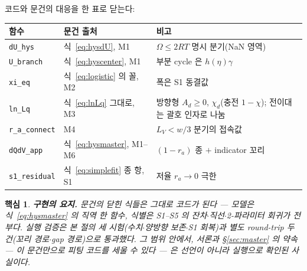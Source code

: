 \documentclass[11pt,a4paper]{article}
\newtheorem*{keybox}{핵심}
\begin{document}
코드와 문건의 대응을 한 표로 닫는다:
\begin{center}
\renewcommand{\arraystretch}{1.3}
\begin{tabular}{p{} p{} p{}}
\toprule
함수 & 문건 출처 & 비고 \\
\midrule
\texttt{dU\_hys} & 식~\eqref{eq:hysdU}, M1 & $\Omega\le2RT$ 명시 분기(NaN 영역) \\
\texttt{U\_branch} & 식~\eqref{eq:hyscenter}, M1 & 부분 cycle 은 $h(\eta)\gamma$ \\
\texttt{xi\_eq} & 식~\eqref{eq:logistic} 의 꼴, M2 & 폭은 S1 동결값 \\
\texttt{ln\_Lq} & 식~\eqref{eq:lnLq} 그대로, M3 & 방향형 $A_d\ge0$, $\chi_d$(충전 $1-\chi$); 전이대는 괄호 인자로 나눔 \\
\texttt{r\_a\_connect} & M4 & $L_V<w/3$ 분기의 접속값 \\
\texttt{dQdV\_app} & 식~\eqref{eq:hysmaster}, M1--M6 & $(1-r_a)$ 종 $+$ indicator 꼬리 \\
\texttt{s1\_residual} & 식~\eqref{eq:simplefit} 종 항, S1 & 저율 $r_a\to0$ 극한 \\
\bottomrule
\end{tabular}
\end{center}

\begin{keybox}
\textbf{구현의 요지.} 문건의 닫힌 식들은 그대로 코드가 된다 — 모델은 식~\eqref{eq:hysmaster} 의 직역
한 함수, 식별은 S1--S5 의 잔차$\cdot$직선$\cdot$2-파라미터 회귀가 전부다. 실행 검증은 본 절의 세
시험(수치$\cdot$양방향 보존$\cdot$S1 회복)과 별도 round-trip 두 건(꼬리 경로$\cdot$gap 경로)으로
통과했다. 그 범위 안에서, 서론과 \S\ref{sec:master} 의 약속 — 이 문건만으로 피팅 코드를 세울 수 있다 — 은 선언이 아니라
실행으로 확인된 사실이다.
\end{keybox}

\end{document}
